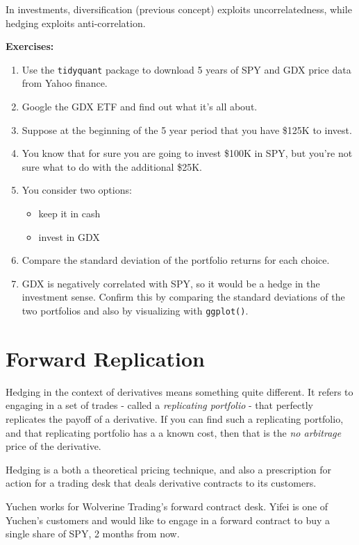 \documentclass[11pt,]{krantz}
\providecommand{\tightlist}{%
  \setlength{\itemsep}{0pt}\setlength{\parskip}{0pt}}
\begin{document}
In investments, diversification (previous concept) exploits uncorrelatedness, while hedging exploits anti-correlation.

\textbf{Exercises:}

\begin{enumerate}
\def\labelenumi{\arabic{enumi}.}
\item
  Use the \texttt{tidyquant} package to download 5 years of SPY and GDX price data from Yahoo finance.
\item
  Google the GDX ETF and find out what it's all about.
\item
  Suppose at the beginning of the 5 year period that you have \$125K to invest.
\item
  You know that for sure you are going to invest \$100K in SPY, but you're not sure what to do with the additional \$25K.
\item
  You consider two options:

  \begin{itemize}
  \tightlist
  \item
    keep it in cash
  \item
    invest in GDX
  \end{itemize}
\item
  Compare the standard deviation of the portfolio returns for each choice.
\item
  GDX is negatively correlated with SPY, so it would be a hedge in the investment sense. Confirm this by comparing the standard deviations of the two portfolios and also by visualizing with \texttt{ggplot()}.
\end{enumerate}

\section{Forward Replication}\label{forward-replication}

Hedging in the context of derivatives means something quite different. It refers to engaging in a set of trades - called a \emph{replicating portfolio} - that perfectly replicates the payoff of a derivative. If you can find such a replicating portfolio, and that replicating portfolio has a a known cost, then that is the \emph{no arbitrage} price of the derivative.

Hedging is a both a theoretical pricing technique, and also a prescription for action for a trading desk that deals derivative contracts to its customers.

Yuchen works for Wolverine Trading's forward contract desk. Yifei is one of Yuchen's customers and would like to engage in a forward contract to buy a single share of SPY, 2 months from now.
\end{document}
